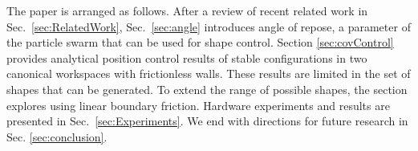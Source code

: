 The paper is arranged as follows. 
After a review of recent related work in Sec.~\ref{sec:RelatedWork},
  Sec.~\ref{sec:angle} introduces angle of repose, a parameter of the particle swarm that can be used for shape control. 
Section \ref{sec:covControl} provides analytical position control results of stable configurations in two canonical workspaces with frictionless walls.  These results are limited in the set of shapes that can be generated.  To extend the range of possible shapes, the section explores using linear boundary friction.
 Hardware experiments and results are presented in Sec.~\ref{sec:Experiments}.
 We end with directions for future research in Sec.  \ref{sec:conclusion}.



